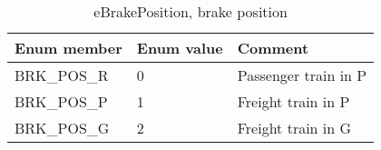 \documentclass{template/openetcs_article}
\begin{document}
\begin{longtable}{|l|l|l|}
	\caption{eBrakePosition, brake position} \\ 
	\hline
		\begin{minipage}[t]{0.45\linewidth} \textbf{Enum member}	\end{minipage}
	&	\begin{minipage}[t]{0.10\linewidth} \textbf{Enum value}	\end{minipage} 
	&	\begin{minipage}[t]{0.50\linewidth} \textbf{Comment} \end{minipage} \\
	\hline
		\begin{minipage}[t]{0.45\linewidth} BRK\_POS\_R \end{minipage} 
	&	\begin{minipage}[t]{0.10\linewidth} 0 \end{minipage} 
	&	\begin{minipage}[t]{0.50\linewidth} Passenger train in P \end{minipage}\\
	\hline
		\begin{minipage}[t]{0.45\linewidth} BRK\_POS\_P \end{minipage} 
	&	\begin{minipage}[t]{0.10\linewidth} 1 \end{minipage} 
	&	\begin{minipage}[t]{0.50\linewidth} Freight train in P \end{minipage}\\
	\hline
		\begin{minipage}[t]{0.45\linewidth} BRK\_POS\_G \end{minipage} 
	&	\begin{minipage}[t]{0.10\linewidth} 2 \end{minipage} 
	&	\begin{minipage}[t]{0.50\linewidth} Freight train in G \end{minipage}\\
	\hline
\end{longtable}
\end{document}
